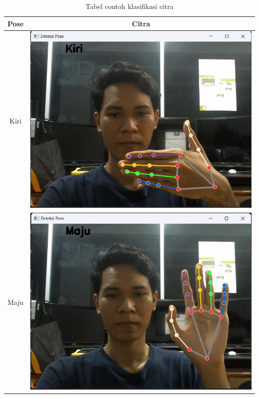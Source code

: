 \begin{table}[H]
\centering
    \caption{Tabel contoh klasifikasi citra}
    \label{tbl:contoh klasifikasi citra}
    \begin{tabular}{|c|c|}
        \hline
        Pose                & Citra              \\ \hline
        Kiri                & \includegraphics[scale=0.33]{gambar/bab3/Kiri.png}   \\ \hline
        Maju                & \includegraphics[scale=0.33]{gambar/bab3/Maju.png}   \\ \hline

\end{tabular}
\end{table}
